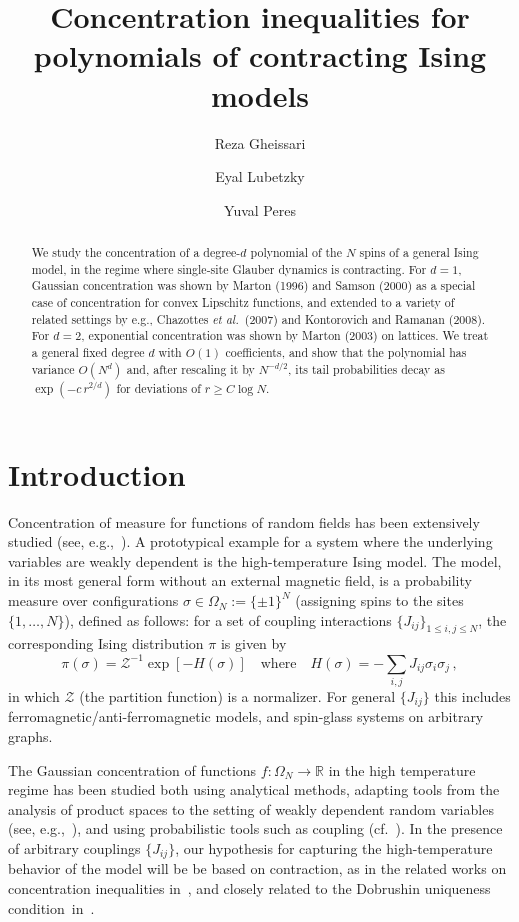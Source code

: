 \documentclass[reqno,11pt]{amsart}
\title[Concentration for polynomials of Ising spin systems]{Concentration inequalities for polynomials of contracting Ising models}
\author{Reza Gheissari}
\author{Eyal Lubetzky}
\author{Yuval Peres}
\numberwithin{equation}{section}
\theoremstyle{definition}{
\newtheorem{example}[theorem]{Example}
\newtheorem{definition}[theorem]{Definition}
\newtheorem*{definition*}{Definition}
\newtheorem{problem}[theorem]{Problem}
\newtheorem{question}[theorem]{Question}
\newtheorem{remark}[theorem]{Remark}
}
\newcommand{\R}{\mathbb R}
\newcommand{\cZ}{\ensuremath{\mathcal Z}}
\begin{document}
\begin{abstract}
We study the concentration of a degree-$d$ polynomial of the $N$ spins of a general Ising model, in the regime where single-site Glauber dynamics is contracting. 
For $d=1$, Gaussian concentration was shown by Marton (1996) and Samson (2000) as a special case of concentration for convex Lipschitz functions, and extended to a variety of related settings by e.g., Chazottes \emph{et al.}~(2007) and Kontorovich and Ramanan (2008). For $d=2$, exponential concentration was shown by Marton (2003) on lattices.
We treat a general fixed degree $d$ with $O(1)$ coefficients, and show that the polynomial has variance $O(N^d)$ and, after rescaling it by $N^{-d/2}$, its tail probabilities decay as $\exp(- c\, r^{2/d})$ for deviations of  $r \geq C \log N$.
\end{abstract}

{\mbox{}
\maketitle
}

\section{Introduction}

Concentration of measure for functions of random fields has been extensively studied (see, e.g.,~\cite{Ledoux}). A prototypical example for a system where the underlying variables are weakly dependent is the high-temperature Ising model.
The model, in its most general form without an external magnetic field, is a probability measure over configurations $\sigma\in \Omega_N := \{\pm 1\}^N$ (assigning spins to the sites $\{1,\ldots,N\}$), defined as follows: for a set of coupling interactions $\{J_{ij}\}_{1\leq i,j\leq N}$, the corresponding Ising distribution $\pi$ is given by 
\[\pi (\sigma)= \mathcal Z^{-1} \exp\left[- H(\sigma)\right]\quad \mbox{where}\quad 
\mbox{$H(\sigma)= -\sum_{i,j} J_{ij} \sigma_i \sigma_j$}\,,\]
in which  $\cZ$ (the partition function) is a normalizer. For general $\{J_{ij}\}$ this includes ferromagnetic/anti-ferromagnetic models, and spin-glass systems on arbitrary graphs.

The Gaussian concentration of functions $f:\Omega_N\to \R$ in the high temperature regime has been studied both using analytical methods, adapting tools from the analysis of product spaces to the setting of weakly dependent random variables (see, e.g.,~\cite{Kulske03,Marton03}), and using probabilistic tools such as coupling (cf.~\cite{Chazottes07}). In the presence of arbitrary couplings $\{J_{ij}\}$, our hypothesis for capturing the high-temperature behavior of the model will be be based on contraction, as in the related works on concentration inequalities in~\cite{Chazottes07,Luczak08,Marton96,Samson00}, and closely related to the Dobrushin uniqueness condition~in~\cite{Kulske03}. 
\end{document}
